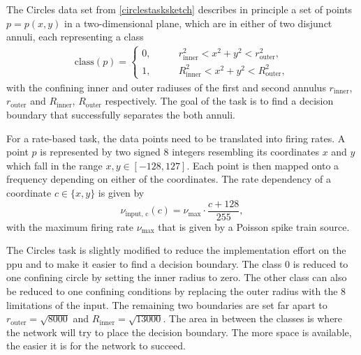 The Circles data set from \cref{circlestasksketch} describes in principle a set of points $p = p(x,y)$ in a two-dimensional plane, which are in either of two disjunct annuli, each representing a class
\begin{align}
\text{class}(p) =
\begin{cases}
0 ,&\quad \quad r_{\text{inner}}^2 < x^2 + y^2 < r_{\text{outer}}^2, \\
1 ,&\quad \quad R_{\text{inner}}^2 < x^2 + y^2 < R_{\text{outer}}^2,
\end{cases}
\end{align}
with the confining inner and outer radiuses of the first and second annulus $r_{\text{inner}}$, $r_{\text{outer}}$ and  $R_{\text{inner}}$, $R_{\text{outer}}$ respectively. The goal of the task is to find a decision boundary that successfully separates the both annuli.

For a rate-based task, the data points need to be translated into firing rates. A point $p$ is represented by two signed \SI{8}{\bit} integers resembling its coordinates $x$ and $y$ which fall in the range $x, y \in [-128,127]$. Each point is then mapped onto a frequency depending on either of the coordinates. The rate dependency of a coordinate $c \in \{x,y\}$ is given by
\begin{equation}\label{inputfrequency}
\nu_{\text{input, c}}(c) = \nu_\text{max} \cdot \frac{c + 128}{255},
\end{equation}
with the maximum firing rate $\nu_\text{max}$ that is given by a Poisson spike train source. 



The Circles task is slightly modified to reduce the implementation effort on the \gls{ppu} and to make it easier to find a decision boundary. The class $0$ is reduced to one confining circle by setting the inner radius to zero. The other class can also be reduced to one confining conditions by replacing the outer radius with the \SI{8}{\bit} limitations of the input. The remaining two boundaries are set far apart to $r_{\text{outer}} = \sqrt{8000}$ and $R_{\text{inner}} = \sqrt{13000}$. The area in between the classes is where the network will try to place the decision boundary. The more space is available, the easier it is for the network to succeed.

